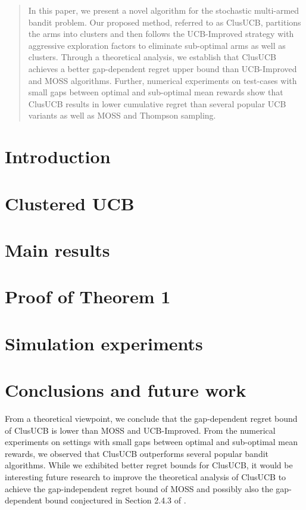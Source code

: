 \documentclass{article}
\begin{document}

\begin{abstract}
In this paper, we present a novel algorithm for the stochastic multi-armed bandit problem. Our proposed method, referred to as ClusUCB, partitions the arms into clusters and then follows the UCB-Improved strategy with aggressive exploration factors to eliminate sub-optimal arms as well as clusters. 
Through a theoretical analysis, we establish that ClusUCB achieves a better gap-dependent regret upper bound than UCB-Improved\cite{auer2010ucb} and MOSS\cite{audibert2009minimax} algorithms. Further, numerical experiments on test-cases with small gaps between optimal and sub-optimal mean rewards show that ClusUCB results in lower cumulative regret than several popular UCB variants as well as MOSS and Thompson sampling.
\end{abstract}

\section{Introduction}
\label{sec:intro}


\section{Clustered UCB}
\label{sec:clusucb}


\section{Main results}
\label{sec:results}


\section{Proof of Theorem 1}
\label{sec:proofTheorem}


\section{Simulation experiments}
\label{sec:expts}



\section{Conclusions and future work}
\label{sec:conclusions}
From a theoretical viewpoint, we conclude that the gap-dependent regret bound of ClusUCB is lower than MOSS and UCB-Improved. From the numerical experiments on settings with small gaps between optimal and sub-optimal mean rewards, we observed that ClusUCB outperforms several popular bandit algorithms. 
While we exhibited better regret bounds for ClusUCB, it would be interesting future research to improve the theoretical analysis of ClusUCB to achieve the gap-independent regret bound of MOSS and possibly also the gap-dependent bound conjectured in Section 2.4.3 of \cite{bubeck2012regret}.
\end{document}
